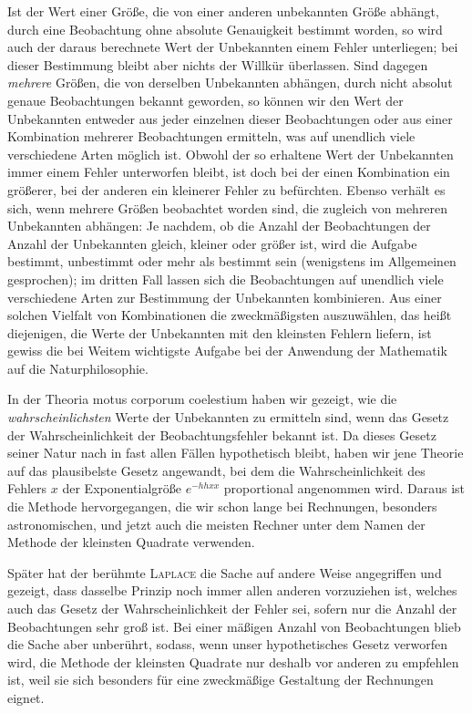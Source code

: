 Ist der Wert einer Größe, die von einer anderen unbekannten Größe abhängt, durch eine Beobachtung ohne absolute Genauigkeit bestimmt worden, so wird auch der daraus berechnete Wert der Unbekannten einem Fehler unterliegen; bei dieser Bestimmung bleibt aber nichts der Willkür überlassen. Sind dagegen \textit{mehrere} Größen, die von derselben Unbekannten abhängen, durch nicht absolut genaue Beobachtungen bekannt geworden, so können wir den Wert der Unbekannten entweder aus jeder einzelnen dieser Beobachtungen oder aus einer Kombination mehrerer Beobachtungen ermitteln, was auf unendlich viele verschiedene Arten möglich ist. Obwohl der so erhaltene Wert der Unbekannten immer einem Fehler unterworfen bleibt, ist doch bei der einen Kombination ein größerer, bei der anderen ein kleinerer Fehler zu befürchten. Ebenso verhält es sich, wenn mehrere Größen beobachtet worden sind, die zugleich von mehreren Unbekannten abhängen: Je nachdem, ob die Anzahl der Beobachtungen der Anzahl der Unbekannten gleich, kleiner oder größer ist, wird die Aufgabe bestimmt, unbestimmt oder mehr als bestimmt sein (wenigstens im Allgemeinen gesprochen); im dritten Fall lassen sich die Beobachtungen auf unendlich viele verschiedene Arten zur Bestimmung der Unbekannten kombinieren. Aus einer solchen Vielfalt von Kombinationen die zweckmäßigsten auszuwählen, das heißt diejenigen, die Werte der Unbekannten mit den kleinsten Fehlern liefern, ist gewiss die bei Weitem wichtigste Aufgabe bei der Anwendung der Mathematik auf die Naturphilosophie.

In der Theoria motus corporum coelestium haben wir gezeigt, wie die \textit{wahrscheinlichsten} Werte der Unbekannten zu ermitteln sind, wenn das Gesetz der Wahrscheinlichkeit der Beobachtungsfehler bekannt ist. Da dieses Gesetz seiner Natur nach in fast allen Fällen hypothetisch bleibt, haben wir jene Theorie auf das plausibelste Gesetz angewandt, bei dem die Wahrscheinlichkeit des Fehlers \(x\) der Exponentialgröße \(e^{-hhxx}\) proportional angenommen wird. Daraus ist die Methode hervorgegangen, die wir schon lange bei Rechnungen, besonders astronomischen, und jetzt auch die meisten Rechner unter dem Namen der Methode der kleinsten Quadrate verwenden.

Später hat der berühmte \textsc{Laplace} die Sache auf andere Weise angegriffen und gezeigt, dass dasselbe Prinzip noch immer allen anderen vorzuziehen ist, welches auch das Gesetz der Wahrscheinlichkeit der Fehler sei, sofern nur die Anzahl der Beobachtungen sehr groß ist. Bei einer mäßigen Anzahl von Beobachtungen blieb die Sache aber unberührt, sodass, wenn unser hypothetisches Gesetz verworfen wird, die Methode der kleinsten Quadrate nur deshalb vor anderen zu empfehlen ist, weil sie sich besonders für eine zweckmäßige Gestaltung der Rechnungen eignet.

